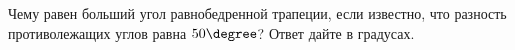 \begin{ex}
	\begin{condition}
		Чему равен больший угол равнобедренной трапеции, если известно, что разность противолежащих углов равна \( 50\degree\)? Ответ дайте в градусах.
	\end{condition}
\end{ex}